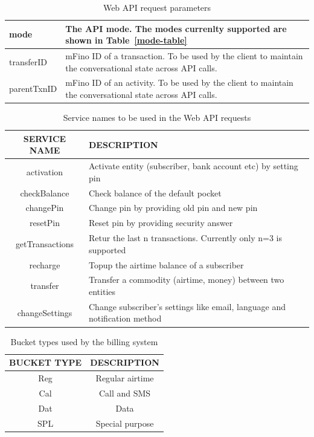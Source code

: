 \documentclass[11pt,titlepage]{article}
\begin{document}
\begin{table}
\begin{tabular}{|p{4cm}|p{9cm}|}
\hline
mode & The API mode. The modes currenlty supported are shown in Table~\ref{mode-table}\\
\hline
transferID & mFino ID of a transaction. To be used by the client to maintain the conversational state across API calls. \\
\hline
parentTxnID & mFino ID of an activity. To be used by the client to maintain the conversational state across API calls.\\
\hline
\end{tabular}
\label{request-table}
\caption{Web API request parameters}
\end{table}

\begin{table}[h]
\centering
\begin{tabular}{|c|p{9cm}|}
\hline
SERVICE NAME & DESCRIPTION \\
\hline
\hline
activation & Activate entity (subscriber, bank account etc) by setting pin \\
\hline
checkBalance & Check balance of the default pocket \\
\hline
changePin & Change pin by providing old pin and new pin \\
\hline
resetPin & Reset pin by providing security answer\\
\hline
getTransactions & Retur the last n transactions. Currently only n=3 is supported\\
\hline
recharge & Topup the airtime balance of a subscriber\\
\hline
transfer & Transfer a commodity (airtime, money) between two entities\\
\hline
changeSettings & Change subscriber's settings like email, language and notification method \\
\hline
\end{tabular}
\label{service-table}
\caption{Service names to be used in the Web API requests}
\end{table}

\begin{table}[h]
\centering
\begin{tabular}{|c|c|}
\hline
BUCKET TYPE & DESCRIPTION\\
\hline
\hline
Reg & Regular airtime\\
\hline
Cal & Call and SMS\\
\hline
Dat & Data\\
\hline
SPL & Special purpose\\
\hline
\end{tabular}
\label{bucket-table}
\caption{Bucket types used by the billing system}
\end{table}
\end{document}
